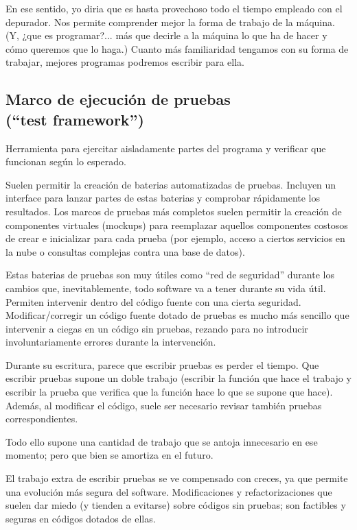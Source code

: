 \documentclass[spanish,12pt,a4paper,final,oneside]{book}
\begin{document}
En ese sentido, yo diria que es hasta provechoso todo el tiempo empleado con el depurador. Nos permite comprender mejor la forma de trabajo de la máquina. (Y, ¿que es programar?... más que decirle a la máquina lo que ha de hacer y cómo queremos que lo haga.) Cuanto más familiaridad tengamos con su forma de trabajar, mejores programas podremos escribir para ella.



\subsection{Marco de ejecución de pruebas\\(``test framework'')}
Herramienta para ejercitar aisladamente partes del programa y verificar que funcionan según lo esperado.

Suelen permitir la creación de baterias automatizadas de pruebas.  Incluyen un interface para lanzar partes de estas baterias y comprobar rápidamente los resultados. Los marcos de pruebas más completos suelen permitir la creación de componentes virtuales (mockups) para reemplazar aquellos componentes costosos de crear e inicializar para cada prueba (por ejemplo, acceso a ciertos servicios en la nube o consultas complejas contra una base de datos).

Estas baterias de pruebas son muy útiles como ``red de seguridad'' durante los cambios que, inevitablemente, todo software va a tener durante su vida útil. Permiten intervenir dentro del código fuente con una cierta seguridad. Modificar/corregir un código fuente dotado de pruebas es mucho más sencillo que intervenir a ciegas en un código sin pruebas, rezando para no introducir involuntariamente errores durante la intervención.

Durante su escritura, parece que escribir pruebas es perder el tiempo. Que escribir pruebas supone un doble trabajo (escribir la función que hace el trabajo y escribir la prueba que verifica que la función hace lo que se supone que hace). Además, al modificar el código, suele ser necesario revisar también pruebas correspondientes. 

Todo ello supone una cantidad de trabajo que se antoja innecesario en ese momento; pero que bien se amortiza en el futuro.

El trabajo extra de escribir pruebas se ve compensado con creces, ya que permite una evolución más segura del software. Modificaciones y refactorizaciones que suelen dar miedo (y tienden a evitarse) sobre códigos sin pruebas; son factibles y seguras en códigos dotados de ellas.
\end{document}
